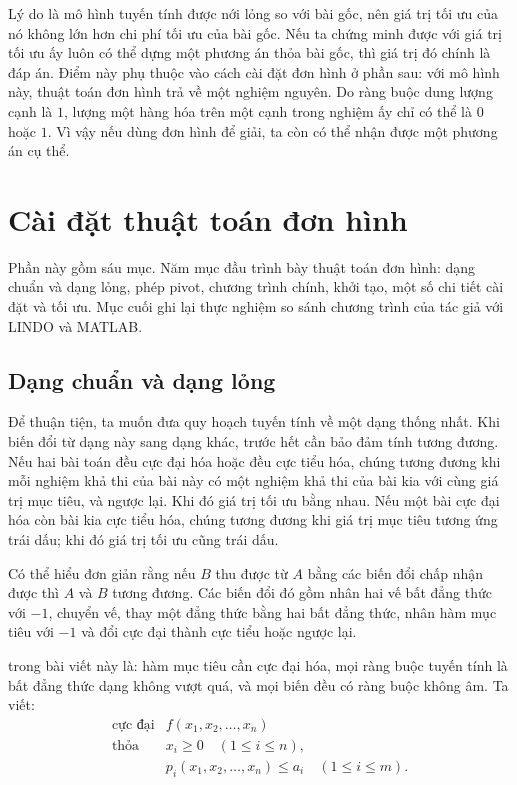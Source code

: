 \documentclass[11pt]{article}
\begin{document}
Lý do là mô hình tuyến tính được nới lỏng so với bài gốc, nên giá trị tối ưu
của nó không lớn hơn chi phí tối ưu của bài gốc. Nếu ta chứng minh được với
giá trị tối ưu ấy luôn có thể dựng một phương án thỏa bài gốc, thì giá trị đó
chính là đáp án. Điểm này phụ thuộc vào cách cài đặt đơn hình ở phần sau:
với mô hình này, thuật toán đơn hình trả về một nghiệm nguyên. Do ràng buộc
dung lượng cạnh là $1$, lượng một hàng hóa trên một cạnh trong nghiệm ấy chỉ
có thể là $0$ hoặc $1$. Vì vậy nếu dùng đơn hình để giải, ta còn có thể nhận
được một phương án cụ thể.

\section{Cài đặt thuật toán đơn hình}

Phần này gồm sáu mục. Năm mục đầu trình bày thuật toán đơn hình: dạng chuẩn
và dạng lỏng, phép pivot, chương trình chính, khởi tạo, một số chi tiết cài
đặt và tối ưu. Mục cuối ghi lại thực nghiệm so sánh chương trình của tác giả
với LINDO và MATLAB.

\subsection{Dạng chuẩn và dạng lỏng}

Để thuận tiện, ta muốn đưa quy hoạch tuyến tính về một dạng thống nhất. Khi
biến đổi từ dạng này sang dạng khác, trước hết cần bảo đảm tính tương đương.
Nếu hai bài toán đều cực đại hóa hoặc đều cực tiểu hóa, chúng tương đương khi
mỗi nghiệm khả thi của bài này có một nghiệm khả thi của bài kia với cùng
giá trị mục tiêu, và ngược lại. Khi đó giá trị tối ưu bằng nhau. Nếu một bài
cực đại hóa còn bài kia cực tiểu hóa, chúng tương đương khi giá trị mục tiêu
tương ứng trái dấu; khi đó giá trị tối ưu cũng trái dấu.

Có thể hiểu đơn giản rằng nếu $B$ thu được từ $A$ bằng các biến đổi chấp nhận
được thì $A$ và $B$ tương đương. Các biến đổi đó gồm nhân hai vế bất đẳng
thức với $-1$, chuyển vế, thay một đẳng thức bằng hai bất đẳng thức, nhân hàm
mục tiêu với $-1$ và đổi cực đại thành cực tiểu hoặc ngược lại.

 trong bài viết này là: hàm mục tiêu cần cực đại hóa, mọi
ràng buộc tuyến tính là bất đẳng thức dạng không vượt quá, và mọi biến đều
có ràng buộc không âm. Ta viết:
\[
\begin{array}{ll}
\text{cực đại} & f(x_1,x_2,\ldots,x_n)\\
\text{thỏa} & x_i\ge 0\quad (1\le i\le n),\\
& p_i(x_1,x_2,\ldots,x_n)\le a_i\quad (1\le i\le m).
\end{array}
\]
\end{document}
